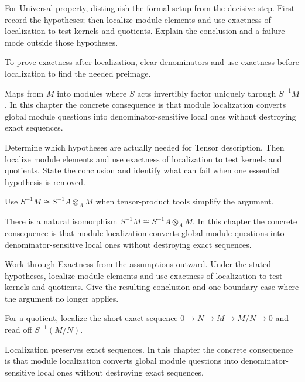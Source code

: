 \begin{exercise}\label{exr:v07-03}
For Universal property, distinguish the formal setup from the decisive step. First record the hypotheses; then localize module elements and use exactness of localization to test kernels and quotients. Explain the conclusion and a failure mode outside those hypotheses.
\end{exercise}
\begin{hint}
To prove exactness after localization, clear denominators and use exactness before localization to find the needed preimage.
\end{hint}
\begin{solution}
Maps from $M$ into modules where $S$ acts invertibly factor uniquely through $S^{-1}M$. In this chapter the concrete consequence is that module localization converts global module questions into denominator-sensitive local ones without destroying exact sequences.
\end{solution}

\begin{exercise}\label{exr:v07-04}
Determine which hypotheses are actually needed for Tensor description. Then localize module elements and use exactness of localization to test kernels and quotients. State the conclusion and identify what can fail when one essential hypothesis is removed.
\end{exercise}
\begin{hint}
Use \(S^{-1}M\cong S^{-1}A\otimes_A M\) when tensor-product tools simplify the argument.
\end{hint}
\begin{solution}
There is a natural isomorphism $S^{-1}M\cong S^{-1}A\otimes_A M$. In this chapter the concrete consequence is that module localization converts global module questions into denominator-sensitive local ones without destroying exact sequences.
\end{solution}

\begin{exercise}\label{exr:v07-05}
Work through Exactness from the assumptions outward. Under the stated hypotheses, localize module elements and use exactness of localization to test kernels and quotients. Give the resulting conclusion and one boundary case where the argument no longer applies.
\end{exercise}
\begin{hint}
For a quotient, localize the short exact sequence \(0\to N\to M\to M/N\to0\) and read off \(S^{-1}(M/N)\).
\end{hint}
\begin{solution}
Localization preserves exact sequences. In this chapter the concrete consequence is that module localization converts global module questions into denominator-sensitive local ones without destroying exact sequences.
\end{solution}

